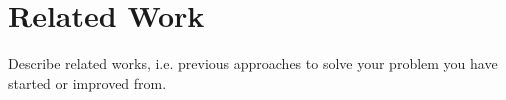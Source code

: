 \section{Related Work}
\label{sec:related}

Describe related works, i.e. previous approaches to solve your problem you have started or improved from.

